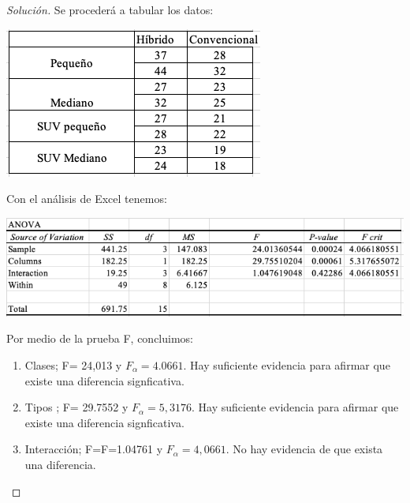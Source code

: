 \documentclass[a4paper,12pt]{article}
\newenvironment{solution}
  {\renewcommand\qedsymbol{$\blacksquare$}\begin{proof}[Solución]}
  {\end{proof}}
\begin{document}
\begin{solution}
Se procederá a tabular los datos:
\begin{center}
    \includegraphics[scale=0.5]{Images/data-last.png}
\end{center}
Con el análisis de Excel tenemos: 
\begin{center}
    \includegraphics[scale=0.5]{Images/32-bueno.png}
\end{center}
Por medio de la prueba F, concluimos: 
\begin{enumerate}
    \item Clases; F= 24,013 y $F_\alpha=4.0661$. Hay suficiente evidencia para afirmar que existe una diferencia signficativa.
    \item Tipos ; F= 29.7552 y $F_\alpha=5,3176$. Hay suficiente evidencia para afirmar que existe una diferencia signficativa.
    \item Interacción; F=F=1.04761 y $F_\alpha=4,0661$. No hay evidencia de que exista una diferencia.
\end{enumerate}
\end{solution}
\end{document}
